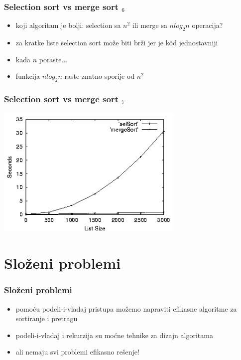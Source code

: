 \documentclass[utf8,compress,aspectratio=169]{beamer}
\begin{document}
\begin{frame}[fragile]
  \frametitle{Selection sort vs merge sort $_6$}
  \begin{itemize}
    \item koji algoritam je bolji: selection sa $n^2$ ili merge sa $n log_2 n$ operacija?
    \item za kratke liste selection sort može biti brži jer je kôd jednostavniji
    \item kada $n$ poraste...
    \item funkcija $n log_2 n$ raste znatno sporije od $n^2$
  \end{itemize}
\end{frame}

\begin{frame}[fragile]
  \frametitle{Selection sort vs merge sort $_7$}
\begin{center}
  \includegraphics[width=9cm]{pic29}
\end{center}
\end{frame}

\section{Složeni problemi}

\begin{frame}[fragile]
  \frametitle{Složeni problemi}
  \begin{itemize}
    \item pomoću podeli-i-vladaj pristupa možemo napraviti efikasne algoritme za sortiranje i pretragu
    \item podeli-i-vladaj i rekurzija su moćne tehnike za dizajn algoritama
    \item ali nemaju svi problemi efikasno rešenje!
  \end{itemize}
\end{frame}
\end{document}

